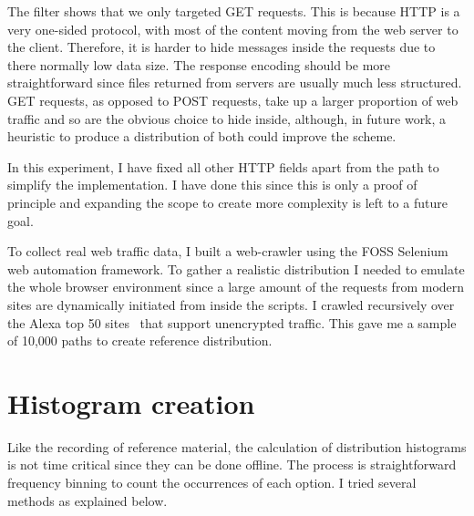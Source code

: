\documentclass[ %
                    author={Samuel Russell},
                supervisor={Prof. Bogdan Warinschi},
                    degree={MEng},
                     title={Innocuous Ciphertexts},
                  subtitle={The DE-CENSOR Scheme},
                      type={Research},
                      year={2018} ]{dissertation}
\begin{document}
The filter shows that we only targeted GET requests. This is because HTTP is a very one-sided protocol, with most of the content moving from the web server to the client.
Therefore, it is harder to hide messages inside the requests due to there normally low data size. The response encoding should be more straightforward since files returned from servers are usually much less structured. GET requests, as opposed to POST requests, take up a larger proportion of web traffic and so are the obvious choice to hide inside, although, in future work, a heuristic to produce a distribution of both could improve the scheme.

In this experiment, I have fixed all other HTTP fields apart from the path to simplify the implementation. I have done this since this is only a proof of principle and expanding the scope to create more complexity is left to a future goal.

To collect real web traffic data, I built a web-crawler using the FOSS Selenium web automation framework. To gather a realistic distribution I needed to emulate the whole browser environment since a large amount of the requests from modern sites are dynamically initiated from inside the scripts.
I crawled recursively over the Alexa top 50 sites~\cite{alexa} that support unencrypted traffic. This gave me a sample of 10,000 paths to create reference distribution.

\section{Histogram creation}

Like the recording of reference material, the calculation of distribution histograms is not time critical since they can be done offline. The process is straightforward frequency binning to count the occurrences of each option. I tried several methods as explained below.
\end{document}
